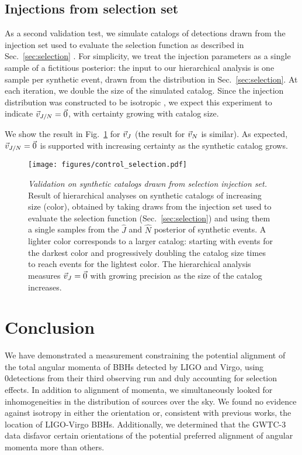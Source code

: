 \documentclass[aps,prd,twocolumn,superscriptaddress,preprintnumbers,floatfix,nofootinbib]{revtex4-2}
\newcommand{\Nevents}{0}
\newcommand{\Nitersel}{}
\newcommand{\Nstartsel}{}
\newcommand{\Nmaxsel}{}
\begin{document}
\subsection{Injections from selection set}
\label{sec:validation:selection}

As a second validation test, we simulate catalogs of detections drawn from the injection set used to evaluate the selection function as described in Sec.~\ref{sec:selection} \cite{o3-selection}.
For simplicity, we treat the injection parameters as a single sample of a fictitious posterior: the input to our hierarchical analysis is one sample per synthetic event, drawn from the distribution in Sec.~\ref{sec:selection}.
At each iteration, we double the size of the simulated catalog.
Since the injection distribution was constructed to be isotropic \cite{o3-selection}, we expect this experiment to indicate $\vec{v}_{J/N} = \vec{0}$, with certainty growing with catalog size.

We show the result in Fig.~\ref{fig:control-sel} for $\vec{v}_{J}$ (the result for $\vec{v}_{N}$ is similar).
As expected, $\vec{v}_{J/N} = \vec{0}$ is supported with increasing certainty as the synthetic catalog grows.

\begin{figure}
\texttt{[image: figures/control\_selection.pdf]}
\caption{\emph{Validation on synthetic catalogs drawn from selection injection set.}
Result of hierarchical analyses on synthetic catalogs of increasing size (color), obtained by taking draws from the injection set used to evaluate the selection function (Sec.~\ref{sec:selection}) and using them a single samples from the $\hat{J}$ and $\hat{N}$ posterior of synthetic events.
A lighter color corresponds to a larger catalog: starting with \Nstartsel events for the darkest color and progressively doubling the catalog size \Nitersel times to reach \Nmaxsel events for the lightest color.
The hierarchical analysis measures $\vec{v}_{J} = \vec{0}$ with growing precision as the size of the catalog increases.
}
\label{fig:control-sel}
\end{figure}

\section{Conclusion}
\label{sec:conclusion}

We have demonstrated a measurement constraining the potential alignment of the total angular momenta of \acp{BBH} detected by LIGO and Virgo, using \Nevents detections from their third observing run and duly accounting for selection effects.
In addition to alignment of momenta, we simultaneously looked for inhomogeneities in the distribution of sources over the sky.
We found no evidence against isotropy in either the orientation or, consistent with previous works, the location of LIGO-Virgo \acp{BBH}.
Additionally, we determined that the GWTC-3 data disfavor certain orientations of the potential preferred alignment of angular momenta more than others.
\end{document}
